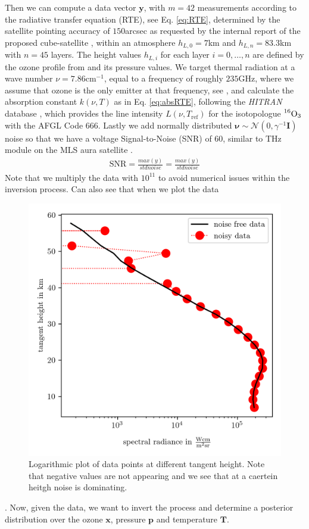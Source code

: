 Then we can compute a data vector $\bm{y}$, with $m = 42$ measurements according to the radiative transfer equation (RTE), see Eq. \ref{eq:RTE}, determined by the satellite pointing accuracy of $150$arcsec as requested by the internal report of the proposed cube-satellite \cite{CubeSatInternal}, within an atmosphere $h_{L,0}=7$km and $h_{L,n} = 83.3$km with $n = 45$ layers.
The height values $h_{L,i}$ for each layer $i = 0,\dots, n$ are defined by the ozone profile from \cite{MLSdata} and its pressure values.
We target thermal radiation at a wave number $\nu = 7.86\text{cm}^{-1}$, equal to a frequency of roughly $235$GHz, where we assume that ozone is the only emitter at that frequency, see \cite{}, and calculate the absorption constant $k(\nu,T)$ as in Eq. \ref{eq:absRTE}, following the \textit{HITRAN} database \cite{gordon2022hitran2020}, which provides the line intensity $L(\nu,T_{\text{ref}})$ for the isotopologue $\prescript{16}{}{\text{O}}_3$ with the AFGL Code 666.
Lastly we add normally distributed $\bm{\nu} \sim \mathcal{N}(0,\gamma^{-1} \bm{I})$ noise so that we have a voltage Signal-to-Noise (SNR) of $60$, similar to THz module on the MLS aura satellite \cite{pickett2006snr}.
\begin{align}
	\text{SNR} = \frac{max(y)}{std noise} = \frac{max(y)}{std noise}
\end{align}
Note that we multiply the data with $10^{11}$ to avoid numerical issues within the inversion process.
Can also see that when we plot the data
\begin{figure}[ht!]
	\centering
	\includegraphics{DataPlot.png}
	\caption[Logarithmic plot of data points at different tangent height.]{Logarithmic plot of data points at different tangent height. Note that negative values are not appearing and we see that at a caertein heitgh noise is dominating.}
	\label{fig:}
\end{figure}.
Now, given the data, we want to invert the process and determine a posterior distribution over the ozone $\bm{x}$, pressure $\bm{p}$ and temperature $\bm{T}$.



